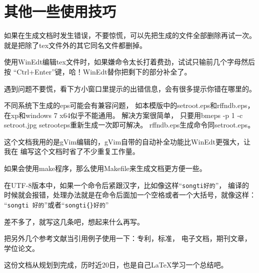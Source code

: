\chapter{其他一些使用技巧}

如果在生成文档时发生错误，不要惊慌，可以先把生成的文件全部删除再试一次。
就是把除了tex文件外的其它同名文件都删掉。

使用WinEdt编辑tex文件时，如果嫌命令太长打着费劲，试试只输前几个字母然后按
“Ctrl+Enter”键，哈！WinEdt替你把剩下的部分补全了。

遇到问题不要慌，看下方小窗口里提示的出错信息，会有很多提示你错在哪里的。

不同系统下生成的eps可能会有兼容问题，
如本模版中的setroot.eps和rffndb.eps，在xp和windows 7 x64似乎不能通用。
解决方案很简单，
只要用bmeps -p 1 -c setroot.jpg setrooteps重新生成一次即可解决。
rffndb.eps生成命令同setroot.eps。

这个文档我用的是gVim编辑的，gVim自带的自动补全功能比WinEdt更强大，让我在
编写这个文档时省了不少重复工作量。

如果会使用make程序，那么使用Makefile来生成文档更方便一些。

在UTF-8版本中，如果一个命令后紧跟汉字，比如像这样“\verb+songti好的+”，
编译的时候就会报错，处理办法就是在命令后面加一个空格或者一个大括号，就像这样：
“\verb+songti 好的+”或者“\verb+songti{}好的+”

差不多了，就写这几条吧，想起来什么再写。

把另外几个参考文献当引用例子使用一下：专利\cite{WangZL}，标准\cite{WangStd}，
电子文档\cite{ZLB:1997}，期刊文章\cite{LUOZ:2007}，
学位论文\cite{wang:2008,wangmt:2008}。

这份文档从规划到完成，历时近20日，也是自己\LaTeX 学习一个总结吧。
